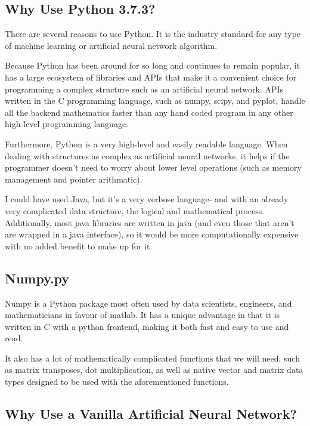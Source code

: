 \documentclass[12pt]{article}
\begin{document}
    \subsection{Why Use Python 3.7.3?}

        There are several reasons to use Python. It is the industry standard for any type of machine learning or artificial neural network algorithm.

        Because Python has been around for so long and continues to remain popular, it has a large ecosystem of libraries and APIs that make it a convenient choice for programming a complex structure such as an artificial neural network. APIs written in the C programming language, such as numpy, scipy, and pyplot, handle all the backend mathematics faster than any hand coded program in any other high level programming language.
    
        Furthermore, Python is a very high-level and easily readable language. When dealing with structures as complex as artificial neural networks, it helps if the programmer doesn't need to worry about lower level operations (such as memory management and pointer arithmatic).

        I could have used Java, but it's a very verbose language- and with an already very complicated data structure, the logical and mathematical process. Additionally, most java libraries are written in java (and even those that aren't are wrapped in a java interface), so it would be more computationally expensive with no added benefit to make up for it.

    \subsection{Numpy.py}

        Numpy is a Python package most often used by data scientists, engineers, and mathematicians in favour of matlab. It has a unique advantage in that it is written in C with a python frontend, making it both fast and easy to use and read.

        It also has a lot of mathematically complicated functions that we will need; such as matrix transposes, dot multiplication, as well as native vector and matrix data types designed to be used with the aforementioned functions.

    \subsection{Why Use a Vanilla Artificial Neural Network?}
\end{document}
